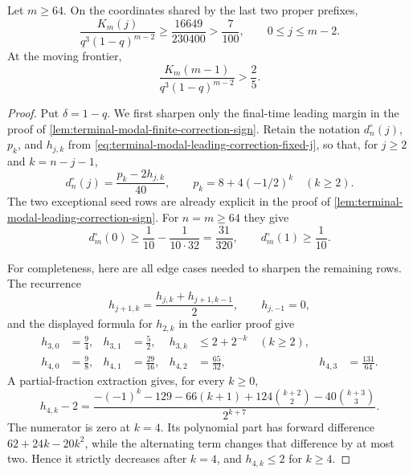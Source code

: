 \begin{lemma}
\label{lem:terminal-modal-sharpened-final-prefix-correction}
Let $m\ge64$.  On the coordinates shared by the last two proper prefixes,
\begin{equation}
 \frac{K_m(j)}{q^3(1-q)^{m-2}}
 \ge \frac{16649}{230400}>\frac7{100},
 \qquad 0\le j\le m-2.
 \label{eq:terminal-modal-sharpened-final-prefix-shared}
\end{equation}
At the moving frontier,
\begin{equation}
 \frac{K_m(m-1)}{q^3(1-q)^{m-2}}>\frac25.
 \label{eq:terminal-modal-sharpened-final-prefix-frontier}
\end{equation}
\end{lemma}

\begin{proof}
Put $\delta=1-q$.  We first sharpen only the final-time leading margin in
the proof of \cref{lem:terminal-modal-finite-correction-sign}.  Retain the
notation $d_n^\circ(j)$, $p_k$, and $h_{j,k}$ from
\eqref{eq:terminal-modal-leading-correction-fixed-j}, so that, for $j\ge2$
and $k=n-j-1$,
\begin{equation}
 d_n^\circ(j)=\frac{p_k-2h_{j,k}}{40},
 \qquad p_k=8+4(-1/2)^k\quad(k\ge2).
 \label{eq:terminal-modal-final-leading-coefficient}
\end{equation}
The two exceptional seed rows are already explicit in the proof of
\cref{lem:terminal-modal-leading-correction-sign}.  For $n=m\ge64$ they give
\begin{equation}
 d_m^\circ(0)\ge\frac1{10}-\frac1{10\cdot32}
 =\frac{31}{320},\qquad d_m^\circ(1)\ge\frac1{10}.
 \label{eq:terminal-modal-final-leading-seed-neighbor}
\end{equation}

For completeness, here are all edge cases needed to sharpen the remaining
rows.  The recurrence
\begin{equation}
 h_{j+1,k}=\frac{h_{j,k}+h_{j+1,k-1}}2,
 \qquad h_{j,-1}=0,
 \label{eq:terminal-modal-final-h-recurrence}
\end{equation}
and the displayed formula for $h_{2,k}$ in the earlier proof give
\begin{align}
 h_{3,0}&=\frac94,&h_{3,1}&=\frac52,&
 h_{3,k}&\le2+2^{-k}\quad(k\ge2),
 \label{eq:terminal-modal-final-h3}\\
 h_{4,0}&=\frac98,&h_{4,1}&=\frac{29}{16},&
 h_{4,2}&=\frac{65}{32},&h_{4,3}&=\frac{131}{64}.
 \label{eq:terminal-modal-final-h4-edge}
\end{align}
A partial-fraction extraction gives, for every $k\ge0$,
\begin{equation}
 h_{4,k}-2=
 \frac{-(-1)^k-129-66(k+1)
 +124\binom{k+2}{2}-40\binom{k+3}{3}}{2^{k+7}}.
 \label{eq:terminal-modal-final-h4-formula}
\end{equation}
The numerator is zero at $k=4$.  Its polynomial part has forward difference
$62+24k-20k^2$, while the alternating term changes that difference by at
most two.  Hence it strictly decreases after $k=4$, and
$h_{4,k}\le2$ for $k\ge4$.


\end{proof}
